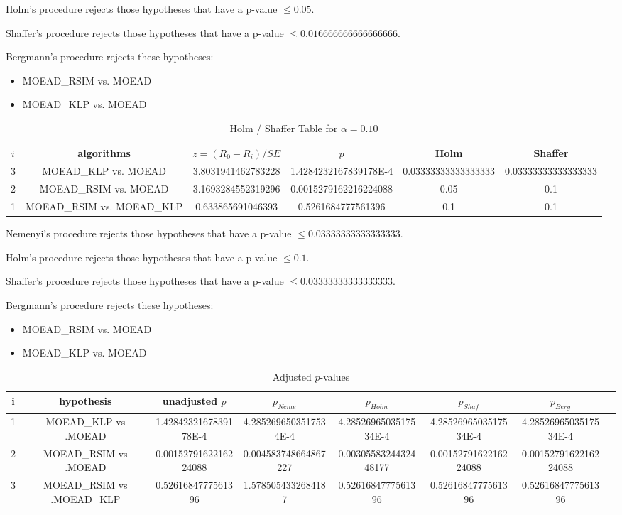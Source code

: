 \documentclass[a4paper,10pt]{article}
\begin{document}
\begin{landscape}
Holm's procedure rejects those hypotheses that have a p-value $\le0.05$.


Shaffer's procedure rejects those hypotheses that have a p-value $\le0.016666666666666666$.


Bergmann's procedure rejects these hypotheses:


\begin{itemize}


\item MOEAD_RSIM vs. MOEAD
\item MOEAD_KLP vs. MOEAD
\end{itemize}


\begin{table}[!htp]
\centering\tiny
\caption{Holm / Shaffer Table for $\alpha=0.10$}
\begin{tabular}{cccccc}
$i$&algorithms&$z=(R_0 - R_i)/SE$&$p$&Holm&Shaffer\\
\hline
3&MOEAD_KLP vs. MOEAD&3.8031941462783228&1.4284232167839178E-4&0.03333333333333333&0.03333333333333333\\
2&MOEAD_RSIM vs. MOEAD&3.1693284552319296&0.0015279162216224088&0.05&0.1\\
1&MOEAD_RSIM vs. MOEAD_KLP&0.633865691046393&0.5261684777561396&0.1&0.1\\
\hline
\end{tabular}
\end{table}
Nemenyi's procedure rejects those hypotheses that have a p-value $\le0.03333333333333333$.


Holm's procedure rejects those hypotheses that have a p-value $\le0.1$.


Shaffer's procedure rejects those hypotheses that have a p-value $\le0.03333333333333333$.


Bergmann's procedure rejects these hypotheses:


\begin{itemize}


\item MOEAD_RSIM vs. MOEAD
\item MOEAD_KLP vs. MOEAD
\end{itemize}


\begin{table}[!htp]
\centering\tiny
\caption{Adjusted $p$-values}
\begin{tabular}{cccccccc}
i&hypothesis&unadjusted $p$&$p_{Neme}$&$p_{Holm}$&$p_{Shaf}$&$p_{Berg}$\\
\hline
1&MOEAD_KLP vs .MOEAD&1.4284232167839178E-4&4.2852696503517534E-4&4.2852696503517534E-4&4.2852696503517534E-4&4.2852696503517534E-4\\
2&MOEAD_RSIM vs .MOEAD&0.0015279162216224088&0.004583748664867227&0.0030558324432448177&0.0015279162216224088&0.0015279162216224088\\
3&MOEAD_RSIM vs .MOEAD_KLP&0.5261684777561396&1.5785054332684187&0.5261684777561396&0.5261684777561396&0.5261684777561396\\
\hline
\end{tabular}
\end{table}

\end{landscape}
\end{document}
